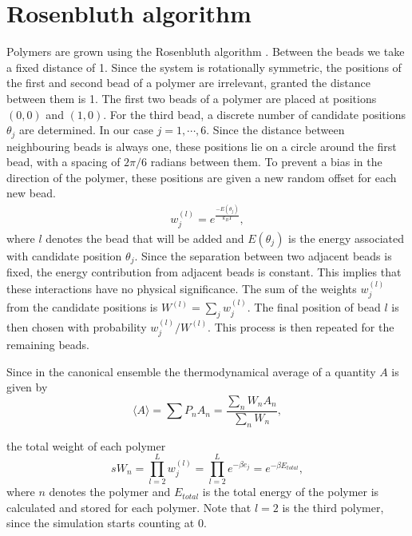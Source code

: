 \section{Rosenbluth algorithm}
Polymers are grown using the Rosenbluth algorithm \cite{rosenbluth1955monte}. Between the beads we take a fixed distance of 1. Since the system is rotationally symmetric, the positions of the first and second bead of a polymer are irrelevant, granted the distance between them is 1. The first two beads of a polymer are placed at positions $(0,0)$ and $(1,0)$. For the third bead, a discrete number of candidate positions $\theta_j$ are determined. In our case $j=1,\cdots,6$. Since the distance between neighbouring beads is always one, these positions lie on a circle around the first bead, with a spacing of $2\pi/6$ radians between them. To prevent a bias in the direction of the polymer, these positions are given a new random offset for each new bead.
\begin{gather}
    w_j^{(l)} = e^\frac{-E(\theta_j)}{k_BT},
\end{gather} where $l$ denotes the bead that will be added and $E(\theta_j)$ is the energy associated with candidate position $\theta_j$. Since the separation between two adjacent beads is fixed, the energy contribution from adjacent beads is constant. This implies that these interactions have no physical significance. The sum of the weights $w_j^{(l)}$ from the candidate positions is $W^{(l)} = \sum_j w_j^{(l)}$. The final position of bead $l$ is then chosen with probability $w_j^{(l)}/W^{(l)}$. This process is then repeated for the remaining beads.

Since in the canonical ensemble the thermodynamical average of a quantity $A$ is given by
\begin{equation}
\langle A \rangle = \sum P_nA_n = \frac{\sum_n W_n A_n}{\sum_n W_n},
\end{equation}

the total weight of each polymer
\begin{equation}\label{eq:polymer_weight}s
    W_n = \prod_{l=2}^L w_j^{(l)} = \prod_{l=2}^Le^{-\beta e_j} = e^{-\beta E_{total}},
\end{equation} where $n$ denotes the polymer and $E_{total}$ is the total energy of the polymer is calculated and stored for each polymer.  Note that $l=2$ is the third polymer, since the simulation starts counting at $0$.